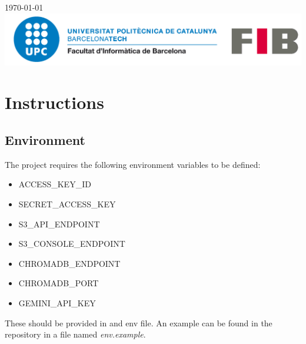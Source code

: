 \documentclass[12pt]{article}
\begin{document}
\begin{titlepage}
{\large \today}\\[2cm] %


\includegraphics[scale=0.3]{logo-upc.png}\\[1cm]
 

\vfill %

\end{titlepage}

\newpage

\tableofcontents

\newpage


\newpage

\section{Instructions}

\subsection{Environment}
The project requires the following environment variables to be defined:
\begin{itemize}
    \item ACCESS\_KEY\_ID
    \item SECRET\_ACCESS\_KEY
    \item S3\_API\_ENDPOINT
    \item S3\_CONSOLE\_ENDPOINT
    \item CHROMADB\_ENDPOINT
    \item CHROMADB\_PORT
    \item GEMINI\_API\_KEY
\end{itemize}
These should be provided in and env file. An example can be found in the repository in a file named \textit{env.example}.
\end{document}

